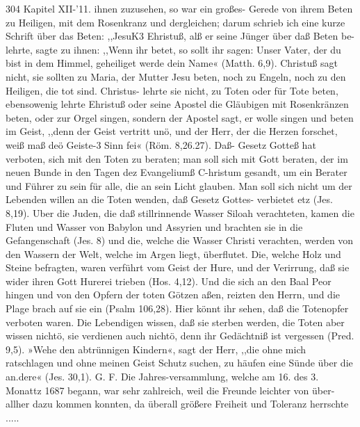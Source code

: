 304 Kapitel XII-’11.
ihnen zuzusehen, so war ein großes- Gerede von ihrem Beten zu
Heiligen, mit dem Rosenkranz und dergleichen; darum schrieb ich
eine kurze Schrift über das Beten:
,,JesuK3 Ehristuß, alß er seine Jünger über daß Beten be-
lehrte, sagte zu ihnen: ,,Wenn ihr betet, so sollt ihr sagen: Unser
Vater, der du bist in dem Himmel, geheiliget werde dein Name«
(Matth. 6,9). Christuß sagt nicht, sie sollten zu Maria, der
Mutter Jesu beten, noch zu Engeln, noch zu den Heiligen, die
tot sind. Christus- lehrte sie nicht, zu Toten oder für Tote
beten, ebensowenig lehrte Ehristuß oder seine Apostel die Gläubigen
mit Rosenkränzen beten, oder zur Orgel singen, sondern der
Apostel sagt, er wolle singen und beten im Geist, ,,denn der
Geist vertritt unö, und der Herr, der die Herzen forschet, weiß maß
deö Geiste-3 Sinn fei« (Röm. 8,26.27). Daß- Gesetz Gotteß hat
verboten, sich mit den Toten zu beraten; man soll sich mit Gott
beraten, der im neuen Bunde in den Tagen dez Evangeliumß
C-hristum gesandt, um ein Berater und Führer zu sein für alle,
die an sein Licht glauben. Man soll sich nicht um der Lebenden
willen an die Toten wenden, daß Gesetz Gottes- verbietet etz
(Jes. 8,19). Uber die Juden, die daß stillrinnende Wasser Siloah
verachteten, kamen die Fluten und Wasser von Babylon und
Assyrien und brachten sie in die Gefangenschaft (Jes. 8) und die,
welche die Wasser Christi verachten, werden von den Wassern
der Welt, welche im Argen liegt, überflutet. Die, welche Holz
und Steine befragten, waren verführt vom Geist der Hure, und
der Verirrung, daß sie wider ihren Gott Hurerei trieben (Hos. 4,12).
Und die sich an den Baal Peor hingen und von den Opfern der
toten Götzen aßen, reizten den Herrn, und die Plage brach
auf sie ein (Psalm 106,28). Hier könnt ihr sehen, daß die
Totenopfer verboten waren. Die Lebendigen wissen, daß sie
sterben werden, die Toten aber wissen nichtö, sie verdienen auch
nichtö, denn ihr Gedächtniß ist vergessen (Pred. 9,5). »Wehe den
abtrünnigen Kindern«, sagt der Herr, ,,die ohne mich ratschlagen
und ohne meinen Geist Schutz suchen, zu häufen eine Sünde über
die an.dere« (Jes. 30,1). G. F.
Die Jahres-versammlung, welche am 16. des 3. Monattz 1687
begann, war sehr zahlreich, weil die Freunde leichter von über-
allher dazu kommen konnten, da überall größere Freiheit und
Toleranz herrschte .....


